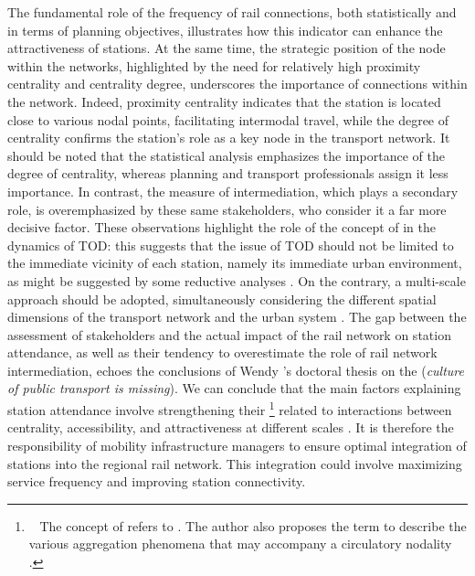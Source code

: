 \begin{refsegment}
The fundamental role of the frequency of rail connections, both statistically and in terms of planning objectives, illustrates how this indicator can enhance the attractiveness of stations. At the same time, the strategic position of the node within the networks, highlighted by the need for relatively high proximity centrality and centrality degree, underscores the importance of connections within the network. Indeed, proximity centrality indicates that the station is located close to various nodal points, facilitating intermodal travel, while the degree of centrality confirms the station's role as a key node in the transport network. It should be noted that the statistical analysis emphasizes the importance of the degree of centrality, whereas planning and transport professionals assign it less importance. In contrast, the measure of intermediation, which plays a secondary role, is overemphasized by these same stakeholders, who consider it a far more decisive factor. These observations highlight the role of the concept of  in the dynamics of \acrshort{TOD}: this suggests that the issue of \acrshort{TOD} should not be limited to the immediate vicinity of each station, namely its immediate urban environment, as might be suggested by some reductive analyses \textcolor{blue}{\autocite[10]{cerema_articuler_2015}}. On the contrary, a multi-scale approach should be adopted, simultaneously considering the different spatial dimensions of the transport network and the urban system \textcolor{blue}{\textcite[11]{cervero_transit_1998}}. The gap between the assessment of stakeholders and the actual impact of the rail network on station attendance, as well as their tendency to overestimate the role of rail network intermediation, echoes the conclusions of Wendy \textcolor{blue}{\autocite[79]{tan_pursuing_2013}}'s doctoral thesis on the  (\textsl{culture of public transport is missing}). We can conclude that the main factors explaining station attendance involve strengthening their \footnote{~
    The concept of  refers to  \textcolor{blue}{\autocite[5]{bavoux_nodalite_2005}}. The author also proposes the term  to describe the various aggregation phenomena that may accompany a circulatory nodality \textcolor{blue}{\autocite[13]{bavoux_nodalite_2005}}.
} related to interactions between centrality, accessibility, and attractiveness at different scales \textcolor{blue}{\autocite[13]{bavoux_nodalite_2005}}. It is therefore the responsibility of mobility infrastructure managers to ensure optimal integration of stations into the regional rail network. This integration could involve maximizing service frequency and improving station connectivity.%


\end{refsegment}
